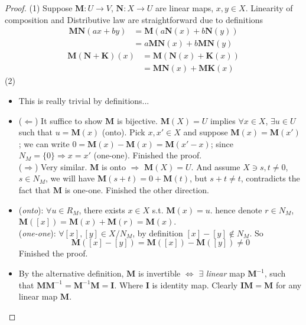 \documentclass[a4paper, 10pt]{article}
\theoremstyle{definition}
\theoremstyle{hSol}
\begin{document}
\begin{proof} (1) Suppose $\bm{M}: U\to V$, $\bm{N}: X\to U$ are linear maps, $x,y\in X$. Linearity of composition and Distributive law are straightforward due to definitions
\begin{equation}
  \begin{split}
    \bm{M}\bm{N}(ax+by) &= \bm{M}(a \bm{N}(x) + b \bm{N}(y))\\
    &= a \bm{MN}(x) + b \bm{MN}(y)
  \end{split}
\end{equation}
\begin{equation}
  \begin{split}
    \bm{M}(\bm{N}+\bm{K})(x) &= \bm{M}(\bm{N}(x)+\bm{K}(x))\\
    & = \bm{MN}(x) + \bm{MK}(x)
  \end{split}
\end{equation}
(2) 
\begin{itemize}
  \item[1] This is really trivial by definitions...
  \item[2] ($\Leftarrow$) It suffice to show $\bm{M}$ is bijective. $\bm{M}(X)=U$ implies $\forall x\in X$, $\exists u\in U$ such that $u=\bm{M}(x)$ (onto). Pick $x,x'\in X$ and suppose $\bm{M}(x)=\bm{M}(x')$; we can write $0=\bm{M}(x)-\bm{M}(x)=\bm{M}(x'-x)$; since $N_{M}=\{0\} \Rightarrow x=x'$ (one-one). Finished the proof.\\
  ($\Rightarrow$) Very similar. $\bm{M}$ is onto $\Rightarrow$ $\bm{M}(X)=U$. And assume $X\ni s,t\ne 0$, $s\in N_M$, we will have $\bm{M}(s+t)=0+\bm{M}(t)$, but $s+t\ne t$, contradicts the fact that $\bm{M}$ is one-one. Finished the other direction.
  \item[3] (\textit{onto}): $\forall u\in R_M$, there exists $x\in X$ s.t. $\bm{M}(x)=u$. hence denote $r\in N_M$, $\bm{M}([x])=\bm{M}(x)+\bm{M}(r)=\bm{M}(x)$.\\
  (\textit{one-one}): $\forall [x],[y]\in X/N_M$, by definition $[x]-[y]\notin N_M$. So
  \begin{equation}
    \bm{M}([x]-[y])=\bm{M}([x])-\bm{M}([y]) \ne 0
  \end{equation}
  Finished the proof.
  \item[4] By the alternative definition, $\bm{M}$ is invertible $\iff$ $\exists$ \textit{linear} map $\bm{M}^{-1}$, such that $\bm{M}\bm{M}^{-1}=\bm{M}^{-1}\bm{M}=\bm{I}$. Where $\bm{I}$ is identity map. Clearly $\bm{IM}=\bm{M}$ for any linear map $\bm{M}$.\\

\end{itemize}
\end{proof}
\end{document}
